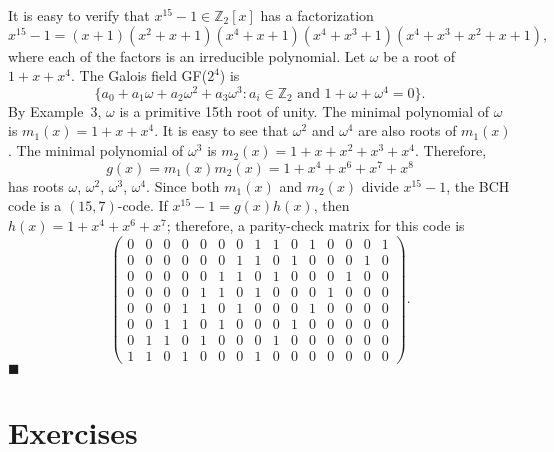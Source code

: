It is easy to verify that $x^{15} - 1 \in {\mathbb Z}_2[x]$ has a
factorization
$$
x^{15} - 1 = (x + 1)(x^2 + x + 1)(x^4 + x + 1)(x^4 + x^3 + 1)(x^4 +
x^3 + x^2 + x + 1),
$$
where each of the factors is an irreducible polynomial.
Let $\omega$ be a root of $1 + x + x^4$. The Galois field GF($2^4$) is
$$
\{
a_0 + a_1 \omega + a_2 \omega^2 + a_3 \omega^3 : a_i \in {\mathbb Z}_2
\mbox{ and } 1 + \omega + \omega^4 = 0
\}.
$$
By Example~3, $\omega$ is a primitive 15th root of unity. The
minimal polynomial of $\omega$ is $m_1(x) = 1 + x + x^4$. It is easy
to see that $\omega^2$ and $\omega^4$ are also roots of $m_1(x)$. The
minimal polynomial of $\omega^3$ is $m_2(x) = 1 + x + x^2 + x^3 +
x^4$. Therefore, 
$$
g(x) = m_1(x) m_2(x) = 1 + x^4 + x^6 + x^7 + x^8
$$
has roots $\omega$, $\omega^2$, $\omega^3$, $\omega^4$.  Since both $m_1(x)$
and $m_2(x)$ divide $x^{15} - 1$, the BCH code is a $(15, 7)$-code. If
$x^{15} -1 = g(x)h(x)$, then $h(x) = 1 + x^4 + x^6 + x^7$; therefore,
a parity-check matrix for this code is
$$
\left(
\begin{array}{ccccccccccccccc}
0 & 0 & 0 & 0 & 0 & 0 & 0 & 1 & 1 & 0 & 1 & 0 & 0 & 0 & 1 \\
0 & 0 & 0 & 0 & 0 & 0 & 1 & 1 & 0 & 1 & 0 & 0 & 0 & 1 & 0 \\
0 & 0 & 0 & 0 & 0 & 1 & 1 & 0 & 1 & 0 & 0 & 0 & 1 & 0 & 0 \\
0 & 0 & 0 & 0 & 1 & 1 & 0 & 1 & 0 & 0 & 0 & 1 & 0 & 0 & 0 \\
0 & 0 & 0 & 1 & 1 & 0 & 1 & 0 & 0 & 0 & 1 & 0 & 0 & 0 & 0 \\
0 & 0 & 1 & 1 & 0 & 1 & 0 & 0 & 0 & 1 & 0 & 0 & 0 & 0 & 0 \\
0 & 1 & 1 & 0 & 1 & 0 & 0 & 0 & 1 & 0 & 0 & 0 & 0 & 0 & 0 \\
1 & 1 & 0 & 1 & 0 & 0 & 0 & 1 & 0 & 0 & 0 & 0 & 0 & 0 & 0
\end{array}
\right).
$$
\hspace{\fill} $\blacksquare$


 
\section*{Exercises}
\exrule

